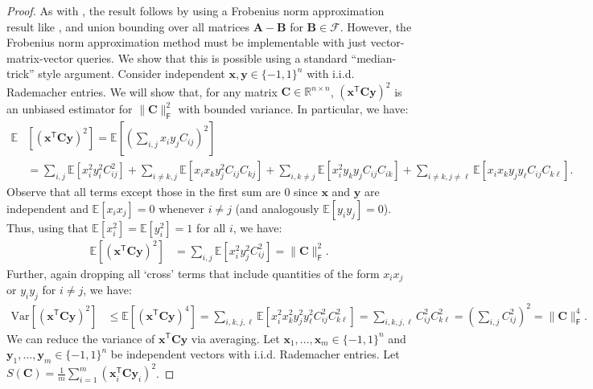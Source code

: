 \documentclass{article}[11pt]
\theoremstyle{definition}
\newcommand{\E}{\mathbb{E}}
\newcommand{\Var}{\mathrm{Var}}
\newcommand{\bv}[1]{\boldsymbol{\mathbf{#1}}}
\newcommand{\T}{\mathsf{T}}
\newcommand{\Fro}{\mathsf{F}}
\newcommand{\F}{\mathcal{F}}
\begin{document}
    \begin{proof}
        As with , the result follows by using a Frobenius norm approximation result like , and union bounding over all matrices $\bv A - \bv B$ for $\bv B \in \F$. However, the Frobenius norm approximation method must be implementable with just vector-matrix-vector queries. We show that this is possible using a standard ``median-trick'' style argument. Consider independent $\bv {x},\bv y \in \{-1,1\}^n$ with i.i.d. Rademacher entries. We will show that, for any matrix $\bv C \in \mathbb R^{n \times n}$, $(\bv x^\T \bv C \bv y)^2$ is an unbiased estimator for $\|\bv C\|_\Fro^2$ with bounded variance. In particular, we have:
        \begin{align*}
            \E&\left[(\bv x^\T \bv C \bv y)^2\right] = \mathbb E\left [\left (\sum_{i,j}  x_i  y_j  C_{ij} \right )^2 \right ]\\
            &= \sum_{i,j} \E\left[ x_i^2 y_i^2  C_{ij}^2\right] + \sum_{i \neq k, j} \E\left[ x_i x_k y_j^2  C_{ij} C_{kj}\right] + \sum_{i, k \neq j} \E\left[ x_i^2  y_k y_j C_{ij} C_{ik}\right] + \sum_{i \neq k, j \neq \ell} \E\left[ x_i  x_k  y_j y_\ell C_{ij} C_{k\ell}\right].
        \end{align*}
        Observe that all terms except those in the first sum are $0$ since $\bv x$ and $\bv y$ are independent and $\E[x_i x_j] = 0$ whenever $i \neq j$ (and analogously $\E[ y_i y_j] = 0$). Thus, using that $\E[ x_i^2] = \E[ y_i^2] = 1$ for all $i$, we have:
        \begin{align}\label{eq:camExp}
        \E\left[(\bv x^\T \bv C \bv y)^2\right] &= \sum_{i,j} \E\left[x_i^2 y_j^2 C_{ij}^2\right] = \|\bv C\|_\Fro^2.
        \end{align}
        Further, again dropping all `cross' terms that include quantities of the form $ x_i  x_j$ or $ y_i  y_j$ for $i \neq j$, we have:
        \begin{align}\label{eq:CamVar}
            \Var[(\bv x^\T \bv C \bv y)^2] &\le \E\left[(\bv x^\T \bv C \bv y)^4\right] = \sum_{i, k, j, \ell} \E[x_i^2 x_k^2 y_j^2  y_\ell^2  C_{ij}^2  C_{k\ell}^2] = \sum_{i, k, j, \ell}  C_{ij}^2  C_{k\ell}^2 = \left (\sum_{i,j}  C_{ij}^2 \right)^2 = \|\bv C\|_\Fro^4.
        \end{align}
        We can reduce the variance of $\bv x^\T \bv C \bv y$ via averaging. Let $\bv x_1,\ldots,\bv x_m \in \{-1,1\}^n$ and $\bv y_1,\ldots,\bv y_m \in \{-1,1\}^n$ be independent vectors with i.i.d. Rademacher entries. Let $S(\bv{C}) = \frac{1}{m} \sum_{i=1}^m (\bv x_i^\T \bv C \bv y_i)^2$.

\end{proof}
\end{document}
